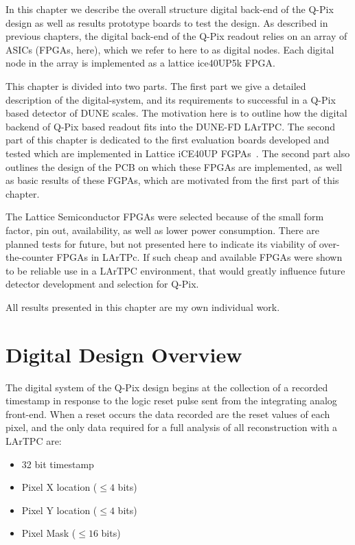 In this chapter we describe the overall structure digital back-end of the Q-Pix design as well as results prototype boards to test the design.
As described in previous chapters, the digital back-end of the Q-Pix readout relies on an array of ASICs (FPGAs, here), which we refer to here to as digital nodes.
Each digital node in the array is implemented as a lattice ice40UP5k FPGA.

This chapter is divided into two parts.
The first part we give a detailed description of the digital-system, and its requirements to successful in a Q-Pix based detector of DUNE scales.
The motivation here is to outline how the digital backend of Q-Pix based readout fits into the DUNE-FD LArTPC. 
The second part of this chapter is dedicated to the first evaluation boards developed and tested which are implemented in Lattice iCE40UP FGPAs~\citep{lattice_ice40up_datasheet}.
The second part also outlines the design of the PCB on which these FPGAs are implemented, as well as basic results of these FGPAs, which are motivated from the first part of this chapter.

The Lattice Semiconductor FPGAs \citep{lattice_ice40up_datasheet} were selected because of the small form factor, pin out, availability, as well as lower power consumption.
There are planned tests for future, but not presented here to indicate its viability of over-the-counter FPGAs in LArTPc. 
If such cheap and available FPGAs were shown to be reliable use in a LArTPC environment, that would greatly influence future detector development and selection for Q-Pix.

All results presented in this chapter are my own individual work.

\section{Digital Design Overview}

The digital system of the Q-Pix design begins at the collection of a recorded timestamp in response to the logic reset pulse sent from the integrating analog front-end.
When a reset occurs the data recorded are the reset values of each pixel, and the only data required for a full analysis of all reconstruction with a LArTPC are:

\begin{itemize}
    \item 32 bit timestamp
    \item Pixel X location ($\le 4$ bits)
    \item Pixel Y location ($\le 4$ bits)
    \item Pixel Mask ($\le 16$ bits)
\end{itemize}
~\label{bit_calc}

